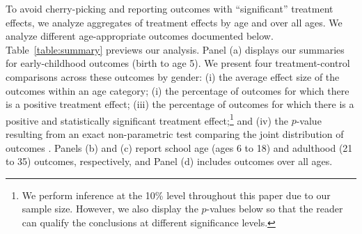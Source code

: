 To avoid cherry-picking and reporting outcomes with ``significant'' treatment effects, we analyze aggregates of treatment effects by age and over all ages. We analyze different age-appropriate outcomes documented below. Table~\ref{table:summary} previews our analysis. Panel (a) displays our summaries for early-childhood outcomes (birth to age 5). We present four treatment-control comparisons across these outcomes by gender: (i) the average effect size of the outcomes within an age category; (i) the percentage of outcomes for which there is a positive treatment effect; (iii) the percentage of outcomes for which there is a positive and statistically significant treatment effect;\footnote{We perform inference at the 10\% level throughout this paper due to our sample size. However, we also display the $p$-values below so that the reader can qualify the conclusions at different significance levels.} and (iv) the $p$-value resulting from an exact non-parametric test comparing the joint distribution of outcomes \citep{Rosenbaum_2005_Distribution_JRSS}. Panels (b) and (c) report school age (ages 6 to 18) and adulthood (21 to 35) outcomes, respectively, and Panel (d) includes outcomes over all ages.


